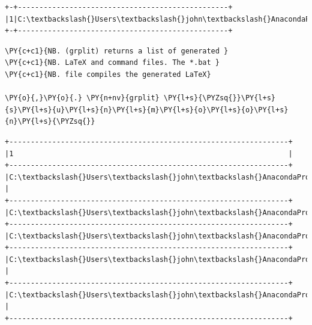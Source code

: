     \begin{Verbatim}[commandchars=\\\{\}]
+-+-------------------------------------------------+
|1|C:\textbackslash{}Users\textbackslash{}john\textbackslash{}AnacondaProjects\textbackslash{}testfolder\textbackslash{}grplit\textbackslash{}|
+-+-------------------------------------------------+
    \end{Verbatim}

    \begin{tcolorbox}[breakable, size=fbox, boxrule=1pt, pad at break*=1mm,colback=cellbackground, colframe=cellborder]
\begin{Verbatim}[commandchars=\\\{\}]
\PY{c+c1}{NB. (grplit) returns a list of generated }
\PY{c+c1}{NB. LaTeX and command files. The *.bat }
\PY{c+c1}{NB. file compiles the generated LaTeX}

\PY{o}{,}\PY{o}{.} \PY{n+nv}{grplit} \PY{l+s}{\PYZsq{}}\PY{l+s}{s}\PY{l+s}{u}\PY{l+s}{n}\PY{l+s}{m}\PY{l+s}{o}\PY{l+s}{o}\PY{l+s}{n}\PY{l+s}{\PYZsq{}}
\end{Verbatim}
\end{tcolorbox}

    \begin{Verbatim}[commandchars=\\\{\}]
+-----------------------------------------------------------------+
|1                                                                |
+-----------------------------------------------------------------+
|C:\textbackslash{}Users\textbackslash{}john\textbackslash{}AnacondaProjects\textbackslash{}testfolder\textbackslash{}grplit\textbackslash{}sunmoon.tex     |
+-----------------------------------------------------------------+
|C:\textbackslash{}Users\textbackslash{}john\textbackslash{}AnacondaProjects\textbackslash{}testfolder\textbackslash{}grplit\textbackslash{}sunmoontitle.tex|
+-----------------------------------------------------------------+
|C:\textbackslash{}Users\textbackslash{}john\textbackslash{}AnacondaProjects\textbackslash{}testfolder\textbackslash{}grplit\textbackslash{}sunmoonoview.tex|
+-----------------------------------------------------------------+
|C:\textbackslash{}Users\textbackslash{}john\textbackslash{}AnacondaProjects\textbackslash{}testfolder\textbackslash{}grplit\textbackslash{}sunmooncode.tex |
+-----------------------------------------------------------------+
|C:\textbackslash{}Users\textbackslash{}john\textbackslash{}AnacondaProjects\textbackslash{}testfolder\textbackslash{}grplit\textbackslash{}sunmoon.bat     |
+-----------------------------------------------------------------+
    \end{Verbatim}

